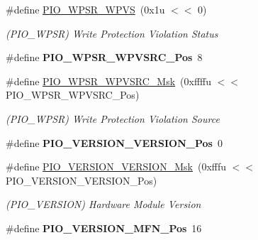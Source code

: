 \begin{DoxyCompactItemize}
\#define \mbox{\hyperlink{group__SAMV71__PIO_gab2743f8c6f0577c266f990cdd41b1c47}{P\+I\+O\+\_\+\+W\+P\+S\+R\+\_\+\+W\+P\+VS}}~(0x1u $<$$<$ 0)
\begin{DoxyCompactList}\small\item\em (P\+I\+O\+\_\+\+W\+P\+SR) Write Protection Violation Status \end{DoxyCompactList}\item 
\mbox{\label{group__SAMV71__PIO_gafb016684495c4d9ca79588b692dcce8a}} 
\#define {\bfseries P\+I\+O\+\_\+\+W\+P\+S\+R\+\_\+\+W\+P\+V\+S\+R\+C\+\_\+\+Pos}~8
\item 
\mbox{\label{group__SAMV71__PIO_gacc9b2ff45ba388215533d56205d5357a}} 
\#define \mbox{\hyperlink{group__SAMV71__PIO_gacc9b2ff45ba388215533d56205d5357a}{P\+I\+O\+\_\+\+W\+P\+S\+R\+\_\+\+W\+P\+V\+S\+R\+C\+\_\+\+Msk}}~(0xffffu $<$$<$ P\+I\+O\+\_\+\+W\+P\+S\+R\+\_\+\+W\+P\+V\+S\+R\+C\+\_\+\+Pos)
\begin{DoxyCompactList}\small\item\em (P\+I\+O\+\_\+\+W\+P\+SR) Write Protection Violation Source \end{DoxyCompactList}\item 
\mbox{\label{group__SAMV71__PIO_gae8c98e343cdef68cd4f01b222d2a376b}} 
\#define {\bfseries P\+I\+O\+\_\+\+V\+E\+R\+S\+I\+O\+N\+\_\+\+V\+E\+R\+S\+I\+O\+N\+\_\+\+Pos}~0
\item 
\mbox{\label{group__SAMV71__PIO_gaf8a54acbd4a26f3eb7514c3b16592038}} 
\#define \mbox{\hyperlink{group__SAMV71__PIO_gaf8a54acbd4a26f3eb7514c3b16592038}{P\+I\+O\+\_\+\+V\+E\+R\+S\+I\+O\+N\+\_\+\+V\+E\+R\+S\+I\+O\+N\+\_\+\+Msk}}~(0xfffu $<$$<$ P\+I\+O\+\_\+\+V\+E\+R\+S\+I\+O\+N\+\_\+\+V\+E\+R\+S\+I\+O\+N\+\_\+\+Pos)
\begin{DoxyCompactList}\small\item\em (P\+I\+O\+\_\+\+V\+E\+R\+S\+I\+ON) Hardware Module Version \end{DoxyCompactList}\item 
\mbox{\label{group__SAMV71__PIO_ga6ee2071d5f82fe9eec8347bac21d4062}} 
\#define {\bfseries P\+I\+O\+\_\+\+V\+E\+R\+S\+I\+O\+N\+\_\+\+M\+F\+N\+\_\+\+Pos}~16
\item 
\mbox{\label{group__SAMV71__PIO_ga0147b2b9a8f38dcdfc082552a03bf967}} 
$$
\end{DoxyCompactItemize}
